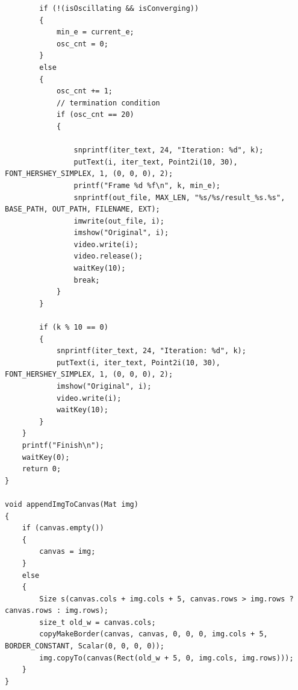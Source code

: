 \documentclass[12pt,a4paper]{report}
\begin{document}
\begin{lstlisting}
        if (!(isOscillating && isConverging))
        {
            min_e = current_e;
            osc_cnt = 0;
        }
        else
        {
            osc_cnt += 1;
            // termination condition
            if (osc_cnt == 20)
            {

                snprintf(iter_text, 24, "Iteration: %d", k);
                putText(i, iter_text, Point2i(10, 30), FONT_HERSHEY_SIMPLEX, 1, (0, 0, 0), 2);
                printf("Frame %d %f\n", k, min_e);
                snprintf(out_file, MAX_LEN, "%s/%s/result_%s.%s", BASE_PATH, OUT_PATH, FILENAME, EXT);
                imwrite(out_file, i);
                imshow("Original", i);
                video.write(i);
                video.release();
                waitKey(10);
                break;
            }
        }

        if (k % 10 == 0)
        {
            snprintf(iter_text, 24, "Iteration: %d", k);
            putText(i, iter_text, Point2i(10, 30), FONT_HERSHEY_SIMPLEX, 1, (0, 0, 0), 2);
            imshow("Original", i);
            video.write(i);
            waitKey(10);
        }
    }
    printf("Finish\n");
    waitKey(0);
    return 0;
}

void appendImgToCanvas(Mat img)
{
    if (canvas.empty())
    {
        canvas = img;
    }
    else
    {
        Size s(canvas.cols + img.cols + 5, canvas.rows > img.rows ? canvas.rows : img.rows);
        size_t old_w = canvas.cols;
        copyMakeBorder(canvas, canvas, 0, 0, 0, img.cols + 5, BORDER_CONSTANT, Scalar(0, 0, 0, 0));
        img.copyTo(canvas(Rect(old_w + 5, 0, img.cols, img.rows)));
    }
}

\end{lstlisting}
\end{document}
